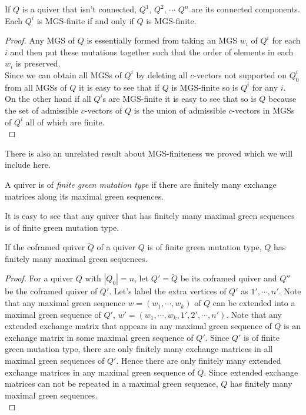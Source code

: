 \begin{lemma}
If $Q$ is a quiver that isn't connected, $Q^1$, $Q^2$, $\cdots$ $Q^n$ are its connected components. Each $Q^i$ is MGS-finite if and only if $Q$ is MGS-finite.
\end{lemma}
\begin{proof}
\indent Any MGS of $Q$ is essentially formed from taking an MGS $w_i$ of $Q^i$ for each $i$ and then put these mutations together such that the order of elements in each $w_i$ is preserved.\\ 
\indent Since we can obtain all MGSs of $Q^i$ by deleting all $c$-vectors not supported on $Q^i_0$ from all MGSs of $Q$ it is easy to see that if $Q$ is MGS-finite so is $Q^i$ for any $i$.\\
\indent On the other hand if all $Q^i$s are MGS-finite it is easy to see that so is $Q$ because the set of admissible $c$-vectors of $Q$ is the union of admissible $c$-vectors in MGSs of $Q^i$ all of which are finite.\\
\end{proof}
\indent There is also an unrelated result about MGS-finiteness we proved which we will include here.
\begin{definition}
A quiver is of \textit{finite green mutation type} if there are finitely many exchange matrices along its maximal green sequences.
\end{definition}
It is easy to see that any quiver that has finitely many maximal green sequences is of finite green mutation type.\\
\begin{lemma}\label{CF1}
If the coframed quiver $\breve{Q}$ of a quiver $Q$ is of finite green mutation type, $Q$ has finitely many maximal green sequences.\\
\end{lemma}
\begin{proof}
For a quiver $Q$ with $|Q_0|=n$, let $Q'=\breve{Q}$ be its coframed quiver and $Q''$ be the coframed quiver of $Q'$. Let's label the extra vertices of $Q'$ as $1',\cdots, n'$. Note that any maximal green sequence $w=(w_1,\cdots, w_k)$ of $Q$ can be extended into a maximal green sequence of $Q'$, $w'=(w_1,\cdots, w_k, 1', 2',\cdots, n')$. Note that any extended exchange matrix that appears in any maximal green sequence of $Q$ is an exchange matrix in some maximal green sequence of $Q'$. Since $Q'$ is of finite green mutation type, there are only finitely many exchange matrices in all maximal green sequences of $Q'$. Hence there are only finitely many extended exchange matrices in any maximal green sequence of $Q$. Since extended exchange matrices can not be repeated in a maximal green sequence, $Q$ has finitely many maximal green sequences.\\ 
\end{proof}

